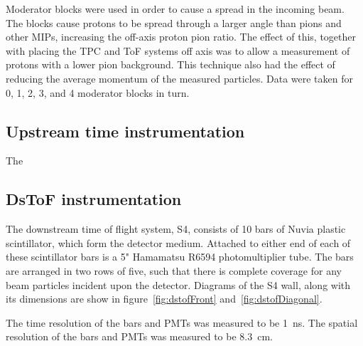     Moderator blocks were used in order to cause a spread in the incoming beam.
    The blocks cause protons to be spread through a larger angle than pions and other MIPs, increasing the off-axis proton pion ratio.
    The effect of this, together with placing the TPC and ToF systems off axis was to allow a measurement of protons with a lower pion background.
    This technique also had the effect of reducing the average momentum of the measured particles.
    Data were taken for 0, 1, 2, 3, and 4 moderator blocks in turn.
    
 
    
	\subsection{Upstream time instrumentation}
    The 

	\subsection{DsToF instrumentation}
	
    The downstream time of flight system, S4, consists of 10 bars of Nuvia plastic scintillator, which form the detector medium. Attached to either end of each of these scintillator bars is a 5" Hamamatsu R6594 photomultiplier tube. The bars are arranged in two rows of five, such that there is complete coverage for any beam particles incident upon the detector. Diagrams of the S4 wall, along with its dimensions are show in figure~\ref{fig:dstofFront} and~\ref{fig:dstofDiagonal}.
    
    The time resolution of the bars and PMTs was measured to be 1~ns. The spatial resolution of the bars and PMTs was measured to be 8.3~cm.
    
